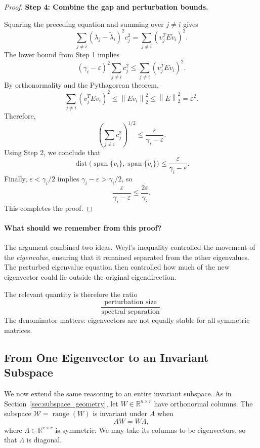 \documentclass[14pt,letterpaper]{article}
\theoremstyle{plain}
\theoremstyle{definition}
\theoremstyle{remark}
\newcommand{\R}{\mathbb{R}}
\newcommand{\norm}[1]{\left\lVert #1 \right\rVert}
\DeclareMathOperator{\range}{range}
\DeclareMathOperator{\Span}{span}
\DeclareMathOperator{\dist}{dist}
\begin{document}
\begin{proof}
\medskip
\noindent\textbf{Step 4: Combine the gap and perturbation bounds.}

Squaring the preceding equation and summing over
$j\neq i$ gives
\[
\sum_{j\neq i}
(\lambda_j-\widetilde\lambda_i)^2c_j^2
=
\sum_{j\neq i}(v_j^TE\widetilde v_i)^2.
\]
The lower bound from Step 1 implies
\[
(\gamma_i-\varepsilon)^2
\sum_{j\neq i}c_j^2
\leq
\sum_{j\neq i}(v_j^TE\widetilde v_i)^2.
\]
By orthonormality and the Pythagorean theorem,
\[
\sum_{j\neq i}(v_j^TE\widetilde v_i)^2
\leq\norm{E\widetilde v_i}_2^2
\leq\norm{E}_2^2=\varepsilon^2.
\]
Therefore,
\[
\left(\sum_{j\neq i}c_j^2\right)^{1/2}
\leq\frac{\varepsilon}{\gamma_i-\varepsilon}.
\]
Using Step 2, we conclude that
\[
\boxed{
\dist\bigl(\Span\{v_i\},\Span\{\widetilde v_i\}\bigr)
\leq\frac{\varepsilon}{\gamma_i-\varepsilon}.
}
\]
Finally, $\varepsilon<\gamma_i/2$ implies
$\gamma_i-\varepsilon>\gamma_i/2$, so
\[
\frac{\varepsilon}{\gamma_i-\varepsilon}
\leq\frac{2\varepsilon}{\gamma_i}.
\]
This completes the proof.
\end{proof}

\paragraph{What should we remember from this proof?}

The argument combined two ideas. Weyl's inequality
controlled the movement of the \emph{eigenvalue},
ensuring that it remained separated from the other
eigenvalues. The perturbed eigenvalue equation then
controlled how much of the new eigenvector could lie
outside the original eigendirection.

The relevant quantity is therefore the ratio
\[
\boxed{
\frac{\text{perturbation size}}
     {\text{spectral separation}}.
}
\]
The denominator matters: eigenvectors are not equally
stable for all symmetric matrices.


\subsection{From One Eigenvector to an Invariant Subspace}
\label{subsec:dk_subspaces}

We now extend the same reasoning to an entire invariant
subspace. As in Section~\ref{sec:subspace_geometry},
let $W\in\R^{n\times r}$ have orthonormal columns.
The subspace $\mathcal W=\range(W)$ is invariant under
$A$ when
\[
\boxed{AW=W\Lambda,}
\]
where $\Lambda\in\R^{r\times r}$ is symmetric. We
may take its columns to be eigenvectors, so that
$\Lambda$ is diagonal.
\end{document}
